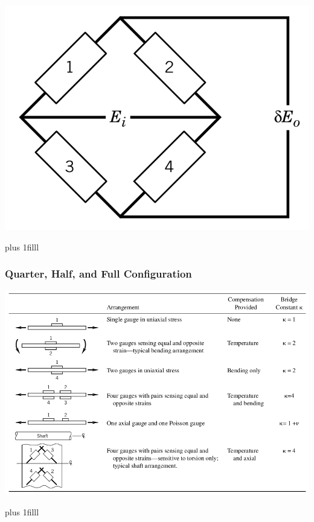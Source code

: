 \documentclass[fleqn]{beamer} %
\newcommand{\sectionIIIsubsectionIItitle}{Quarter, Half, and Full Configuration}
\newcommand{\btVFill}{\vskip0pt plus 1filll}
\begin{document}
\begin{frame}
				\includegraphics[scale=.16]{images/gauge_in_bridge_full.png}

				\btVFill

			\end{frame}

			\begin{frame}
				\frametitle{\sectionIIIsubsectionIItitle}

				\bigskip
				\includegraphics[scale=.3]{images/gauge_configurations.png}
			
				\btVFill

			\end{frame}
\end{document}
